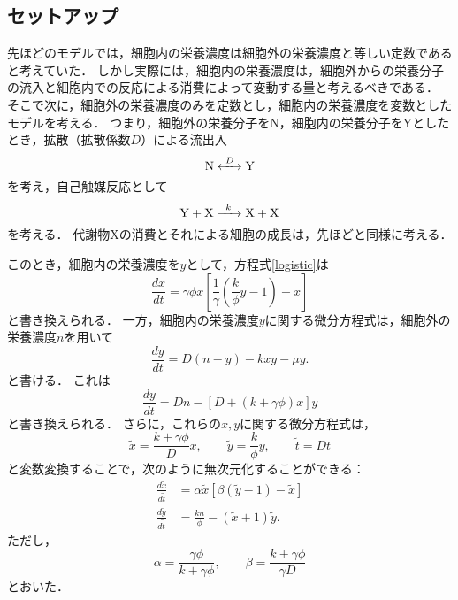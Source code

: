 \subsection{セットアップ}
先ほどのモデルでは，細胞内の栄養濃度は細胞外の栄養濃度と等しい定数であると考えていた．
しかし実際には，細胞内の栄養濃度は，細胞外からの栄養分子の流入と細胞内での反応による消費によって変動する量と考えるべきである．
そこで次に，細胞外の栄養濃度のみを定数とし，細胞内の栄養濃度を変数としたモデルを考える．
つまり，細胞外の栄養分子をN，細胞内の栄養分子をYとしたとき，拡散（拡散係数$D$）による流出入
\begin{equation}
  \ce{N <->[$D$] Y}
\end{equation}
を考え，自己触媒反応として
\begin{equation}
  \ce{Y + X ->[$k$] X + X}
\end{equation}
を考える．
代謝物Xの消費とそれによる細胞の成長は，先ほどと同様に考える．

このとき，細胞内の栄養濃度を$y$として，方程式\eqref{logistic}は
\begin{equation}
  \frac{dx}{dt} = \gamma \phi x \left[\frac{1}{\gamma}\left(\frac{k}{\phi} y - 1\right) - x \right] 
\end{equation}
と書き換えられる．
一方，細胞内の栄養濃度$y$に関する微分方程式は，細胞外の栄養濃度$n$を用いて
\begin{equation}
  \frac{dy}{dt} = D(n-y) - kxy - \mu y.
\end{equation}
と書ける．
これは
\begin{equation}
  \frac{dy}{dt} = Dn - \left[ D + \left(k + \gamma \phi \right)x \right]y
\end{equation}
と書き換えられる．
さらに，これらの$x,y$に関する微分方程式は，
\begin{equation}
  \tilde{x} = \frac{k + \gamma \phi}{D}x,\qquad \tilde{y} = \frac{k}{\phi} y, \qquad \tilde{t} = Dt
\end{equation}
と変数変換することで，次のように無次元化することができる：
\begin{align}
  \frac{d\tilde{x}}{d\tilde{t}} &= \alpha \tilde{x} \left[ \beta \left( \tilde{y} - 1 \right) - \tilde{x} \right] \label{ndx}\\
  \frac{d\tilde{y}}{d\tilde{t}} &= \frac{kn}{\phi} - \left( \tilde{x} + 1\right)\tilde{y}. \label{ndy} 
\end{align}
ただし，
\begin{equation}
  \alpha = \frac{\gamma\phi}{k + \gamma\phi},\qquad \beta = \frac{k + \gamma\phi}{\gamma D}
\end{equation}
とおいた．

